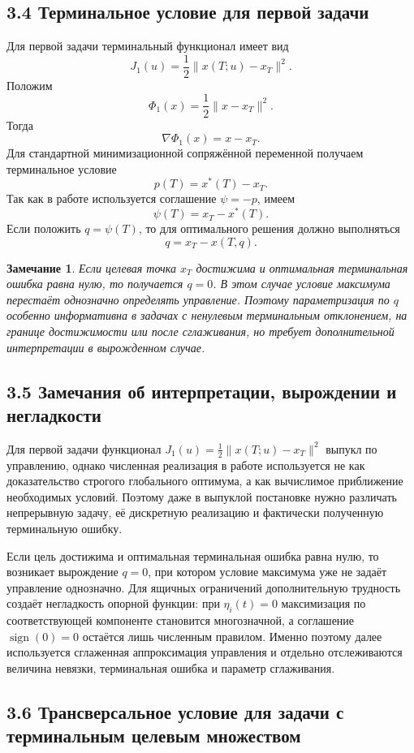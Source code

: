 \documentclass[a4paper,12pt]{article}
\newtheorem{remark}{Замечание}
\begin{document}
\subsection{3.4 Терминальное условие для первой задачи}

Для первой задачи терминальный функционал имеет вид
\[
J_1(u)=\frac{1}{2}\|x(T;u)-x_T\|^2.
\]
Положим
\[
\Phi_1(x)=\frac{1}{2}\|x-x_T\|^2.
\]
Тогда
\[
\nabla\Phi_1(x)=x-x_T.
\]
Для стандартной минимизационной сопряжённой переменной получаем терминальное условие
\[
p(T)=x^*(T)-x_T.
\]
Так как в работе используется соглашение $\psi=-p$, имеем
\[
\psi(T)=x_T-x^*(T).
\]
Если положить $q=\psi(T)$, то для оптимального решения должно выполняться
\[
q=x_T-x(T,q).
\]

\begin{remark}
Если целевая точка $x_T$ достижима и оптимальная терминальная ошибка равна нулю, то получается $q=0$. В этом случае условие максимума перестаёт однозначно определять управление. Поэтому параметризация по $q$ особенно информативна в задачах с ненулевым терминальным отклонением, на границе достижимости или после сглаживания, но требует дополнительной интерпретации в вырожденном случае.
\end{remark}

\subsection{3.5 Замечания об интерпретации, вырождении и негладкости}

Для первой задачи функционал $J_1(u)=\frac12\|x(T;u)-x_T\|^2$ выпукл по управлению, однако численная реализация в работе используется не как доказательство строгого глобального оптимума, а как вычислимое приближение необходимых условий. Поэтому даже в выпуклой постановке нужно различать непрерывную задачу, её дискретную реализацию и фактически полученную терминальную ошибку.

Если цель достижима и оптимальная терминальная ошибка равна нулю, то возникает вырождение $q=0$, при котором условие максимума уже не задаёт управление однозначно. Для ящичных ограничений дополнительную трудность создаёт негладкость опорной функции: при $\eta_i(t)=0$ максимизация по соответствующей компоненте становится многозначной, а соглашение $\operatorname{sign}(0)=0$ остаётся лишь численным правилом. Именно поэтому далее используется сглаженная аппроксимация управления и отдельно отслеживаются величина невязки, терминальная ошибка и параметр сглаживания.

\subsection{3.6 Трансверсальное условие для задачи с терминальным целевым множеством}
\end{document}

